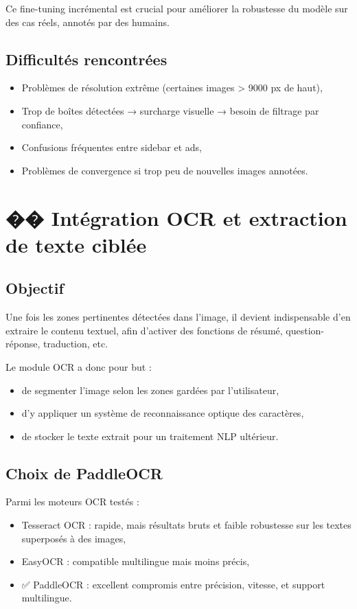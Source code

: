 \documentclass[12pt,a4paper]{report}
\begin{document}
Ce fine-tuning incrémental est crucial pour améliorer la robustesse du modèle sur des cas réels, annotés par des humains.

\section{Difficultés rencontrées}

\begin{itemize}
\item Problèmes de résolution extrême (certaines images > 9000 px de haut),
\item Trop de boîtes détectées → surcharge visuelle → besoin de filtrage par confiance,
\item Confusions fréquentes entre sidebar et ads,
\item Problèmes de convergence si trop peu de nouvelles images annotées.
\end{itemize}

\chapter{�� Intégration OCR et extraction de texte ciblée}

\section{Objectif}

Une fois les zones pertinentes détectées dans l'image, il devient indispensable d'en extraire le contenu textuel, afin d'activer des fonctions de résumé, question-réponse, traduction, etc.

Le module OCR a donc pour but :
\begin{itemize}
\item de segmenter l'image selon les zones gardées par l'utilisateur,
\item d'y appliquer un système de reconnaissance optique des caractères,
\item de stocker le texte extrait pour un traitement NLP ultérieur.
\end{itemize}

\section{Choix de PaddleOCR}

Parmi les moteurs OCR testés :
\begin{itemize}
\item Tesseract OCR : rapide, mais résultats bruts et faible robustesse sur les textes superposés à des images,
\item EasyOCR : compatible multilingue mais moins précis,
\item ✅ PaddleOCR : excellent compromis entre précision, vitesse, et support multilingue.
\end{itemize}
\end{document}

